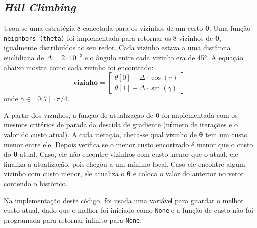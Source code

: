 \documentclass[brazil, 12pt]{article}
\begin{document}
\subsection{\emph{Hill Climbing}}
Usou-se uma estratégia 8-conectada para os vizinhos de um certo $\boldsymbol{\theta}$. Uma função \texttt{neighbors (theta)} foi implementada para retornar os 8 vizinhos de $\boldsymbol{\theta}$, igualmente distribuídos ao seu redor. Cada vizinho estava a uma distância euclidiana de $\Delta = 2\cdot 10^{-3}$ e o ângulo entre cada vizinho era de 45°. A equação abaixo mostra como cada vizinho foi encontrado:
$$\boldsymbol{vizinho} = \left[\begin{array}{c}
	\theta[0] + \Delta \cdot \cos(\gamma)\\
	\theta[1] + \Delta \cdot \sin(\gamma)
\end{array}\right]$$onde $\gamma\in[0:7]\cdot\pi/4$.

A partir dos vizinhos, a função de atualização de $\boldsymbol{\theta}$ foi implementada com os mesmos critérios de parada da descida de gradiente (número de iterações e o valor do custo atual). A cada iteração, checa-se qual vizinho de $\boldsymbol{\theta}$ tem um custo menor entre ele. Depois verifica se o menor custo encontrado é menor que o custo do $\boldsymbol{\theta}$ atual. Caso, ele não encontre vizinhos com custo menor que o atual, ele finaliza a atualização, pois chegou a um mínimo local. Caso ele encontre algum vizinho com custo menor, ele atualiza o $\boldsymbol{\theta}$ e coloca o valor do anterior no vetor contendo o histórico.

Na implementação deste código, foi usada uma variável para guardar o melhor custo atual, dado que o melhor foi iniciado como \texttt{None} e a função de custo não foi programada para retornar infinito para \texttt{None}.
\end{document}
